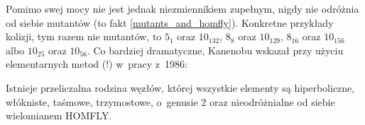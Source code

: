 Pomimo swej mocy nie jest jednak niezmiennikiem zupełnym, nigdy nie odróżnia od siebie mutantów (to fakt \ref{mutants_and_homfly}).
%
Konkretne przykłady kolizji, tym razem nie mutantów, to $5_1$ oraz $10_{132}$, $8_{8}$ oraz $10_{129}$, $8_{16}$ oraz $10_{156}$ albo $10_{25}$ oraz $10_{56}$.
Co bardziej dramatyczne, Kanenobu wskazał przy użyciu elementarnych metod (!) w~pracy \cite{kanenobu86} z~1986:
%

\begin{proposition}
%
%
%
%
%
    Istnieje przeliczalna rodzina węzłów, której wszystkie elementy są hiperboliczne, włókniste, taśmowe, trzymostowe, o~genusie 2 oraz nieodróżnialne od siebie wielomianem HOMFLY.
\end{proposition}


